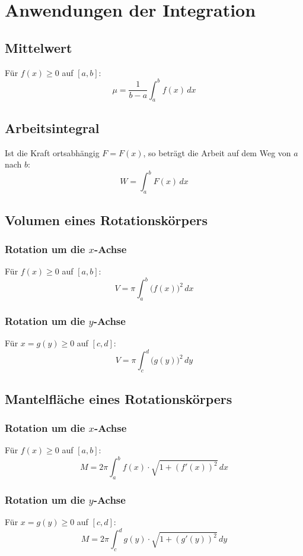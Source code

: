 \section{Anwendungen der Integration}

\subsection{Mittelwert}
Für \(f(x)\geq 0\) auf \([a,b]\):
\[
    \mu = \frac{1}{b-a}\int_a^b f(x)\,dx
\]

\subsection{Arbeitsintegral}
Ist die Kraft ortsabhängig \(F=F(x)\), so beträgt die Arbeit auf dem Weg von \(a\) nach \(b\):
\[
    W = \int_a^b F(x)\,dx
\]

\subsection{Volumen eines Rotationskörpers}

\subsubsection{Rotation um die \(x\)-Achse}
Für \(f(x)\geq 0\) auf \([a,b]\):
\[
    V = \pi\int_a^b \bigl(f(x)\bigr)^2\,dx
\]

\subsubsection{Rotation um die \(y\)-Achse}
Für \(x=g(y)\geq 0\) auf \([c,d]\):
\[
    V = \pi\int_c^d \bigl(g(y)\bigr)^2\,dy
\]

\subsection{Mantelfläche eines Rotationskörpers}

\subsubsection{Rotation um die \(x\)-Achse}
Für \(f(x)\geq 0\) auf \([a,b]\):
\[
    M = 2\pi\int_a^b f(x)\cdot\sqrt{1+(f'(x))^2}\,dx
\]

\subsubsection{Rotation um die \(y\)-Achse}
Für \(x=g(y)\geq 0\) auf \([c,d]\):
\[
    M = 2\pi\int_c^d g(y)\cdot\sqrt{1+(g'(y))^2}\,dy
\]

